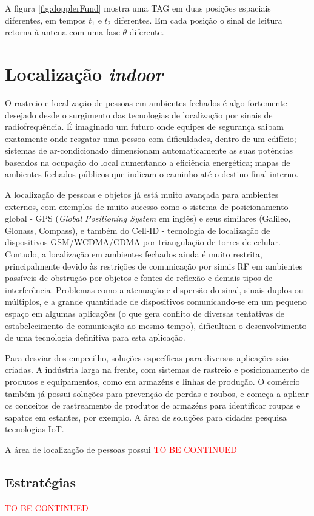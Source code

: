 A figura \ref{fig:dopplerFund} mostra uma TAG em duas posições espaciais diferentes, em tempos $t_1$ e $t_2$ diferentes. Em cada posição o sinal de leitura retorna à antena com uma fase $\theta$ diferente.
    
\section{Localização \textit{indoor}}

O rastreio e localização de pessoas em ambientes fechados é algo fortemente desejado desde o surgimento das tecnologias de localização por sinais de radiofrequência. É imaginado um futuro onde equipes de segurança saibam exatamente onde resgatar uma pessoa com dificuldades, dentro de um edifício; sistemas de ar-condicionado dimensionam automaticamente as suas potências baseados na ocupação do local aumentando a eficiência energética; mapas de ambientes fechados públicos que indicam o caminho até o destino final interno.

A localização de pessoas e objetos já está muito avançada para ambientes externos, com exemplos de muito sucesso como o sistema de posicionamento global - GPS (\textit{Global Positioning System} em inglês) e seus similares (Galileo, Glonass, Compass), e também do Cell-ID - tecnologia de localização de dispositivos GSM/WCDMA/CDMA por triangulação de torres de celular. Contudo, a localização em ambientes fechados ainda é muito restrita, principalmente devido às restrições de comunicação por sinais RF em ambientes passíveis de obstrução por objetos e fontes de reflexão e demais tipos de interferência. Problemas como a atenuação e dispersão do sinal, sinais duplos ou múltiplos, e a grande quantidade de dispositivos comunicando-se em um pequeno espaço em algumas aplicações (o que gera conflito de diversas tentativas de estabelecimento de comunicação ao mesmo tempo), dificultam o desenvolvimento de uma tecnologia definitiva para esta aplicação.

Para desviar dos empecilho, soluções específicas para diversas aplicações são criadas. A indústria larga na frente, com sistemas de rastreio e posicionamento de produtos e equipamentos, como em armazéns e linhas de produção. O comércio também já possui soluções para prevenção de perdas e roubos, e começa a aplicar os conceitos de rastreamento de produtos de armazéns para identificar roupas e sapatos em estantes, por exemplo. A área de soluções para cidades pesquisa tecnologias IoT.

A área de localização de pessoas possui \textcolor{red}{TO BE CONTINUED} %

\subsection{Estratégias}

\textcolor{red}{TO BE CONTINUED} %

